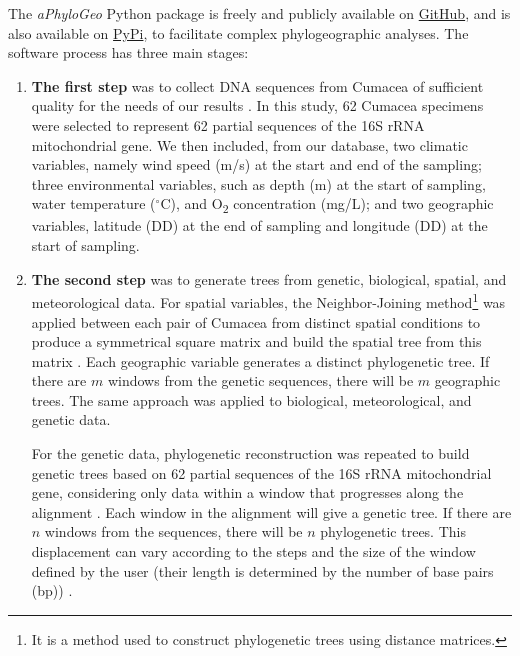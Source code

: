 The \textit{aPhyloGeo} Python package is freely and publicly available on \href{https://github.com/tahiri-lab/aPhyloGeo}{GitHub}, and is also available on \href{https://pypi.org/project/aphylogeo/}{PyPi}, to facilitate complex phylogeographic analyses. The software process has three main stages:

\begin{enumerate}
\item \textbf{The first step} was to collect DNA sequences from Cumacea of sufficient quality for the needs of our results \citep{koshkarov_phylogeography_2022, li2023aphylogeo, li2024host}. In this study, 62 Cumacea specimens were selected to represent 62 partial sequences of the 16S rRNA mitochondrial gene. We then included, from our database, two climatic variables, namely wind speed (m/s) at the start and end of the sampling; three environmental variables, such as depth (m) at the start of sampling, water temperature ($^\circ$C), and O\textsubscript{2} concentration (mg/L); and two geographic variables, latitude (DD) at the end of sampling and longitude (DD) at the start of sampling.

\item \textbf{The second step} was to generate trees from genetic, biological, spatial, and meteorological data. For spatial variables, the {Neighbor-Joining method}\footnote{It is a method used to construct phylogenetic trees using distance matrices.} was applied between each pair of Cumacea from distinct spatial conditions to produce a symmetrical square matrix and build the spatial tree from this matrix \citep{koshkarov_phylogeography_2022}. Each geographic variable generates a distinct phylogenetic tree. If there are $m$ windows from the genetic sequences, there will be $m$ geographic trees. The same approach was applied to biological, meteorological, and genetic data.

For the genetic data, phylogenetic reconstruction was repeated to build genetic trees based on 62 partial sequences of the 16S rRNA mitochondrial gene, considering only data within a window that progresses along the alignment \citep{koshkarov_phylogeography_2022, li2023aphylogeo, li2024host}. Each window in the alignment will give a genetic tree. If there are $n$ windows from the sequences, there will be $n$ phylogenetic trees. This displacement can vary according to the steps and the size of the window defined by the user (their length is determined by the number of base pairs (bp)) \citep{koshkarov_phylogeography_2022, li2023aphylogeo, li2024host}.


\end{enumerate}
